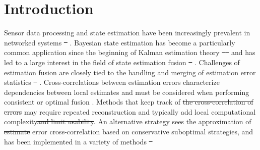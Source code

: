 \documentclass[letterpaper, 10 pt, conference]{ieeeconf}  %
\providecommand{\DIFadd}[1]{{\protect\color{blue}\uwave{#1}}} %
\providecommand{\DIFdel}[1]{{\protect\color{red}\sout{#1}}}                      %
\providecommand{\DIFaddbegin}{} %
\providecommand{\DIFaddend}{} %
\providecommand{\DIFdelbegin}{} %
\providecommand{\DIFdelend}{} %
\begin{document}



\section{Introduction}
Sensor data processing and state estimation have been increasingly prevalent in networked systems \DIFdelbegin \DIFdel{\mbox{%
\cite{ligginsDistributedDataFusion2012,chongFortyYearsDistributed2017}}\hspace{0pt}%
}\DIFdelend \DIFaddbegin \DIFadd{\mbox{%
\cite{ligginsDistributedDataFusion2012}}\hspace{0pt}%
}\DIFaddend . Bayesian state estimation has become a particularly common application since the beginning of Kalman estimation theory \DIFdelbegin \DIFdel{\mbox{%
\cite{kalmanNewApproachLinear1960} }\hspace{0pt}%
}\DIFdelend and has led to a large interest in the field of state estimation fusion \DIFdelbegin \DIFdel{\mbox{%
\cite{willnerKalmanFilterAlgorithms1976,chongHierarchicalEstimation1979,chongDistributedTrackingDistributed1986,hashemipourDecentralizedStructuresParallel1988,grimeDataFusionDecentralized1994}}\hspace{0pt}%
}\DIFdelend \DIFaddbegin \DIFadd{\mbox{%
\cite{willnerKalmanFilterAlgorithms1976,hashemipourDecentralizedStructuresParallel1988,chongFortyYearsDistributed2017}}\hspace{0pt}%
}\DIFaddend . Challenges of estimation fusion are closely tied to the handling and merging of estimation error statistics \DIFdelbegin \DIFdel{\mbox{%
\cite{fouratiMultisensorDataFusion2017}}\hspace{0pt}%
}\DIFdelend \DIFaddbegin \DIFadd{\mbox{%
\cite{noackTreatmentDependentInformation2017}}\hspace{0pt}%
}\DIFaddend . Cross-correlations between estimation errors characterize dependencies between local estimates and must be considered when performing consistent or optimal fusion \cite{bar-shalomTracktotrackCorrelationProblem1981,sunMultisensorOptimalInformation2004}. Methods that keep track of \DIFdelbegin \DIFdel{the cross-correlation of errors }\DIFdelend \DIFaddbegin \DIFadd{these cross-correlations }\DIFaddend may require repeated reconstruction \cite{steinbringOptimalSamplebasedFusion2016} and typically add local computational complexity\DIFdelbegin \DIFdel{and limit usability}\DIFdelend . An alternative strategy sees the approximation of \DIFdelbegin \DIFdel{estimate }\DIFdelend error cross-correlation based on conservative suboptimal strategies, and has been implemented in a variety of methods \DIFdelbegin \DIFdel{\mbox{%
}}
\end{document}
